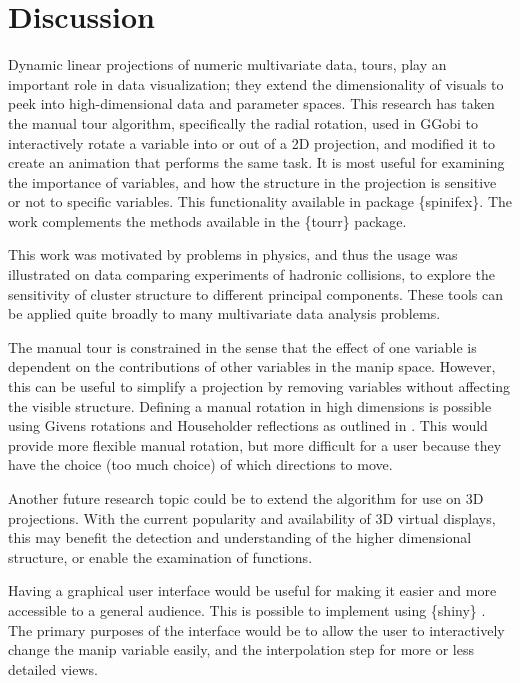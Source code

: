 \documentclass{monashthesis}
\begin{document}
\hypertarget{sec:discussion}{%
\section{Discussion}\label{sec:discussion}}

Dynamic linear projections of numeric multivariate data, tours, play an important role in data visualization; they extend the dimensionality of visuals to peek into high-dimensional data and parameter spaces. This research has taken the manual tour algorithm, specifically the radial rotation, used in GGobi \autocite{swayne_ggobi:_2003} to interactively rotate a variable into or out of a 2D projection, and modified it to create an animation that performs the same task. It is most useful for examining the importance of variables, and how the structure in the projection is sensitive or not to specific variables. This functionality available in package \{spinifex\}. The work complements the methods available in the \{tourr\} package.

This work was motivated by problems in physics, and thus the usage was illustrated on data comparing experiments of hadronic collisions, to explore the sensitivity of cluster structure to different principal components. These tools can be applied quite broadly to many multivariate data analysis problems.

The manual tour is constrained in the sense that the effect of one variable is dependent on the contributions of other variables in the manip space. However, this can be useful to simplify a projection by removing variables without affecting the visible structure. Defining a manual rotation in high dimensions is possible using Givens rotations and Householder reflections as outlined in \textcite{buja_computational_2005}. This would provide more flexible manual rotation, but more difficult for a user because they have the choice (too much choice) of which directions to move.

Another future research topic could be to extend the algorithm for use on 3D projections. With the current popularity and availability of 3D virtual displays, this may benefit the detection and understanding of the higher dimensional structure, or enable the examination of functions.

Having a graphical user interface would be useful for making it easier and more accessible to a general audience. This is possible to implement using \{shiny\} \autocite{chang_shiny_2020}. The primary purposes of the interface would be to allow the user to interactively change the manip variable easily, and the interpolation step for more or less detailed views.
\end{document}
